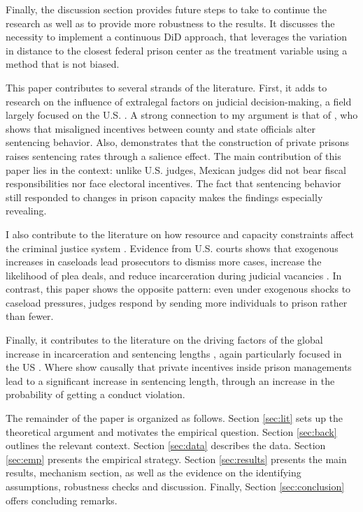 Finally, the discussion section provides future steps to take to continue the research as well as to provide more robustness to the results. It discusses the necessity to implement a continuous DiD approach, that leverages the variation in distance to the closest federal prison center as the treatment variable using a method that is not biased.

This paper contributes to several strands of the literature. First, it adds to research on the influence of extralegal factors on judicial decision-making, a field largely focused on the U.S. \citep{Posner-Judges, Ouss-Incentives, Schnepel, Gordon-Judges-Election, Kling-Random, Aizer-Juvenile, Berdejo-PoliticalCycles, Dippel, Galinato-2020}. A strong connection to my argument is that of \cite{Ouss-Incentives}, who shows that misaligned incentives between county and state officials alter sentencing behavior.  Also, \cite{Dippel} demonstrates that the construction of private prisons raises sentencing rates through a salience effect. The main contribution of this paper lies in the context: unlike U.S. judges, Mexican judges did not bear fiscal responsibilities nor face electoral incentives. The fact that sentencing behavior still responded to changes in prison capacity makes the findings especially revealing.

I also contribute to the literature on how resource and capacity constraints affect the criminal justice system \citep{Yang-Resource-AEJ, JudgeCaseloads-JPE-Shumway, Robel1990, Huang2011}. Evidence from U.S. courts shows that exogenous increases in caseloads lead prosecutors to dismiss more cases, increase the likelihood of plea deals, and reduce incarceration during judicial vacancies \citep{Yang-Resource-AEJ}. In contrast, this paper shows the opposite pattern: even under exogenous shocks to caseload pressures, judges respond by sending more individuals to prison rather than fewer.

Finally, it contributes to the literature on the driving factors of the global increase in incarceration and sentencing lengths \citep{GlobalPrisonTrends}, again particularly focused in the US \citep{Pfaff2007prison, RaphaelPrisonIncrease, Ouss-Incentives, Mukherjee-Private, Ater-Police-Org-JPE}. Where \cite{Mukherjee-Private} show causally that private incentives inside prison managements lead to a significant increase in sentencing length, through an increase in the probability of getting a conduct violation.  

The remainder of the paper is organized as follows. Section \ref{sec:lit} sets up the theoretical argument and motivates the empirical question. Section \ref{sec:back} outlines the relevant context. Section \ref{sec:data} describes the data. Section \ref{sec:emp} presents the empirical strategy. Section \ref{sec:results} presents the main results, mechanism section, as well as the evidence on the identifying assumptions, robustness checks and discussion. Finally, Section \ref{sec:conclusion} offers concluding remarks.


